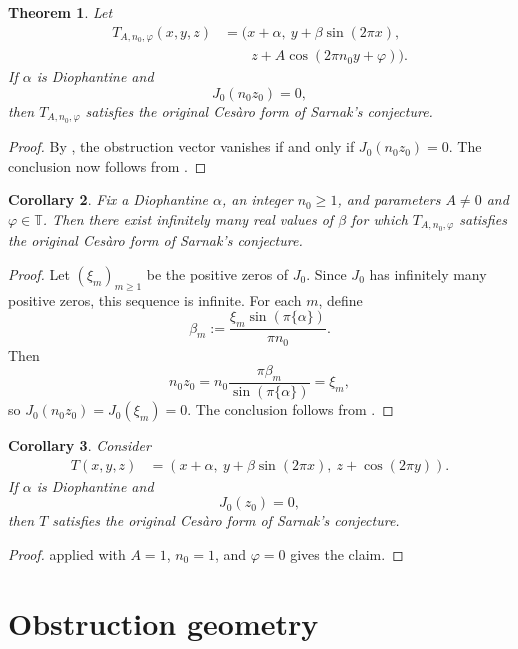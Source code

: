 \documentclass[11pt,reqno]{amsart}
\newtheorem{theorem}{Theorem}[section]
\newtheorem{corollary}[theorem]{Corollary}
\theoremstyle{definition}
\newcommand{\T}{\mathbb{T}}
\begin{document}
\begin{theorem}\label{thm:flagship}
Let
\[
\begin{aligned}
T_{A,n_0,\varphi}(x,y,z)
&=(x+\alpha,\ y+\beta\sin(2\pi x),\\
&\qquad z+A\cos(2\pi n_0 y+\varphi)).
\end{aligned}
\]
If $\alpha$ is Diophantine and
\[
J_0(n_0 z_0)=0,
\]
then $T_{A,n_0,\varphi}$ satisfies the original Ces\`aro form of Sarnak's conjecture.
\end{theorem}

\begin{proof}
By , the obstruction vector vanishes if and only if
$J_0(n_0 z_0)=0$. The conclusion now follows from .
\end{proof}

\begin{corollary}\label{cor:infinite-resonant-family}
Fix a Diophantine $\alpha$, an integer $n_0\ge 1$, and parameters $A\neq 0$ and
$\varphi\in\T$. Then there exist infinitely many real values of $\beta$ for which
$T_{A,n_0,\varphi}$ satisfies the original Ces\`aro form of Sarnak's conjecture.
\end{corollary}

\begin{proof}
Let $(\xi_m)_{m\ge 1}$ be the positive zeros of $J_0$. Since $J_0$ has infinitely many positive
zeros, this sequence is infinite. For each $m$, define
\[
\beta_m:=\frac{\xi_m\sin(\pi\{\alpha\})}{\pi n_0}.
\]
Then
\[
n_0 z_0
=
n_0\frac{\pi\beta_m}{\sin(\pi\{\alpha\})}
=
\xi_m,
\]
so $J_0(n_0 z_0)=J_0(\xi_m)=0$. The conclusion follows from .
\end{proof}

\begin{corollary}\label{cor:basic-model}
Consider
\[
\begin{aligned}
T(x,y,z)
&=(x+\alpha,\ y+\beta\sin(2\pi x),\ z+\cos(2\pi y)).
\end{aligned}
\]
If $\alpha$ is Diophantine and
\[
J_0(z_0)=0,
\]
then $T$ satisfies the original Ces\`aro form of Sarnak's conjecture.
\end{corollary}

\begin{proof}
 applied with $A=1$, $n_0=1$, and $\varphi=0$ gives the claim.
\end{proof}

\section{Obstruction geometry}\label{sec:geometry}
\end{document}
